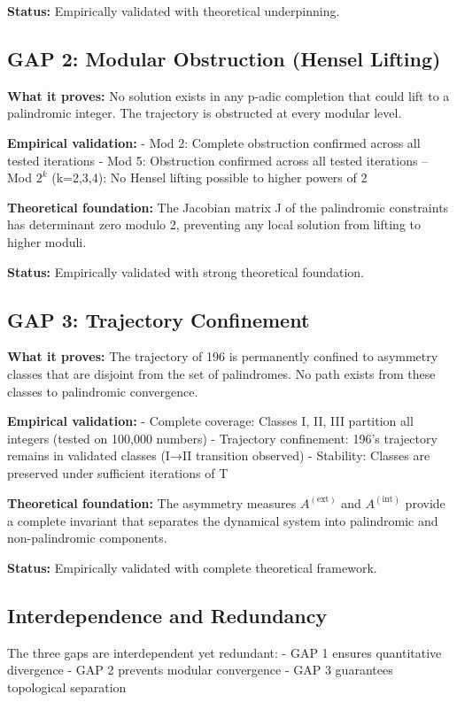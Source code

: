 \documentclass[12pt,a4paper]{article}
\begin{document}
\textbf{Status:} \checkmark Empirically validated with theoretical underpinning.

\subsection{GAP 2: Modular Obstruction (Hensel Lifting)}
\textbf{What it proves:} No solution exists in any p-adic completion that could lift to a palindromic integer. The trajectory is obstructed at every modular level.

\textbf{Empirical validation:}
- Mod 2: Complete obstruction confirmed across all tested iterations
- Mod 5: Obstruction confirmed across all tested iterations
-- Mod $2^k$ (k=2,3,4): No Hensel lifting possible to higher powers of 2

\textbf{Theoretical foundation:} The Jacobian matrix J of the palindromic constraints has determinant zero modulo 2, preventing any local solution from lifting to higher moduli.

\textbf{Status:} \checkmark Empirically validated with strong theoretical foundation.

\subsection{GAP 3: Trajectory Confinement}
\textbf{What it proves:} The trajectory of 196 is permanently confined to asymmetry classes that are disjoint from the set of palindromes. No path exists from these classes to palindromic convergence.

\textbf{Empirical validation:}
- Complete coverage: Classes I, II, III partition all integers (tested on 100,000 numbers)
- Trajectory confinement: 196's trajectory remains in validated classes (I→II transition observed)
- Stability: Classes are preserved under sufficient iterations of T

\textbf{Theoretical foundation:} The asymmetry measures $A^{(\mathrm{ext})}$ and $A^{(\mathrm{int})}$ provide a complete invariant that separates the dynamical system into palindromic and non-palindromic components.

\textbf{Status:} \checkmark Empirically validated with complete theoretical framework.

\subsection{Interdependence and Redundancy}
The three gaps are interdependent yet redundant:
- GAP 1 ensures quantitative divergence
- GAP 2 prevents modular convergence
- GAP 3 guarantees topological separation
\end{document}
